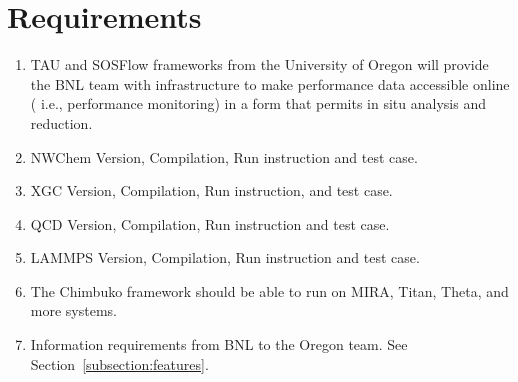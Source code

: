 \section{Requirements}



\begin{enumerate}[label=R-\arabic*)]
\item TAU and SOSFlow frameworks from the University of Oregon will provide the BNL team with infrastructure to make performance data accessible online ( i.e., performance monitoring) in a form that permits in situ analysis and reduction.
\item NWChem Version, Compilation, Run instruction and test case.
\item XGC Version, Compilation, Run instruction, and test case.
\item QCD Version, Compilation, Run instruction and test case. 
\item LAMMPS Version, Compilation, Run instruction and test case.
\item The Chimbuko framework should be able to run on MIRA, Titan, Theta, and more systems.
\item Information requirements from BNL to the Oregon team. See Section~\ref{subsection:features}.
\end{enumerate}

